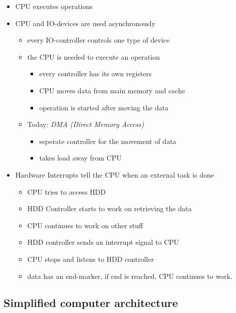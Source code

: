 \begin{itemize}
\tightlist
\item
  CPU executes operations
\item
  CPU and IO-devices are used asynchronously

  \begin{itemize}
  \tightlist
  \item
    every IO-controller controls one type of device
  \item
    the CPU is needed to execute an operation

    \begin{itemize}
    \tightlist
    \item
      every controller has its own registers
    \item
      CPU moves data from main memory and cache
    \item
      operation is started after moving the data
    \end{itemize}
  \item
    Today: \emph{DMA (Direct Memory Access)}

    \begin{itemize}
    \tightlist
    \item
      seperate controller for the movement of data
    \item
      takes load away from CPU
    \end{itemize}
  \end{itemize}
\item
  Hardware Interrupts tell the CPU when an external task is done

  \begin{itemize}
  \tightlist
  \item
    CPU tries to access HDD
  \item
    HDD Controller starts to work on retrieving the data
  \item
    CPU continues to work on other stuff
  \item
    HDD controller sends an interrupt signal to CPU
  \item
    CPU stops and listens to HDD controller
  \item
    data has an end-marker, if end is reached, CPU continues to work.
  \end{itemize}
\end{itemize}

\hypertarget{simplified-computer-architecture}{%
\subsection{Simplified computer
architecture}\label{simplified-computer-architecture}}

